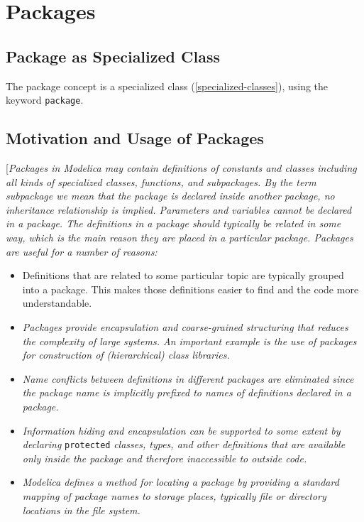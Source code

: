 \chapter{Packages}

\section{Package as Specialized Class}

The package concept is a specialized class (\autoref{specialized-classes}), using the
keyword \lstinline[basicstyle=\ttfamily]!package!.

\section{Motivation and Usage of Packages}

{[}\emph{Packages in Modelica may contain definitions of constants and
classes including all kinds of specialized classes, functions, and
subpackages. By the term subpackage we mean that the package is declared
inside another package, no inheritance relationship is implied.
Parameters and variables cannot be declared in a package. The
definitions in a package should typically be related in some way, which
is the main reason they are placed in a particular package. Packages are
useful for a number of reasons:}

\begin{itemize}
\item
  Definitions that are related to some particular topic are typically
  grouped into a package. This makes those definitions easier to find
  and the code more understandable.
\item
  \emph{Packages provide encapsulation and coarse-grained structuring
  that reduces the complexity of large systems. An important example is
  the use of packages for construction of (hierarchical) class
  libraries.}
\item
  \emph{Name conflicts between definitions in different packages are
  eliminated since the package name is implicitly prefixed to names of
  definitions declared in a package.}
\item
  \emph{Information hiding and encapsulation can be supported to some
  extent by declaring} \lstinline[basicstyle=\ttfamily]!protected! \emph{classes, types, and other
  definitions that are available only inside the package and therefore
  inaccessible to outside code.}
\item
  \emph{Modelica defines a method for locating a package by providing a
  standard mapping of package names to storage places, typically file or
  directory locations in the file system. }
\end{itemize}

